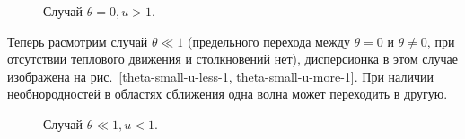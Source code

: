 \documentclass[10pt, a4paper]{article}
\begin{document}
\begin{figure}[h!]
    \caption{\label{theta0-u-more-1} Случай $\theta=0, u > 1$.}
\end{figure}

Теперь расмотрим случай $\theta \ll 1$ (предельного перехода между $\theta=0$ и $\theta \neq 0$, при отсутствии
теплового движения и столкновений нет), дисперсионка в этом случае изображена на рис.~\ref{theta-small-u-less-1, theta-small-u-more-1}. При наличии необнородностей в областях сближения одна волна может переходить в другую.
\begin{figure}[h!]
    \caption{\label{theta-small-u-less-1} Случай $\theta\ll1, u < 1$.}
\end{figure}
\end{document}
